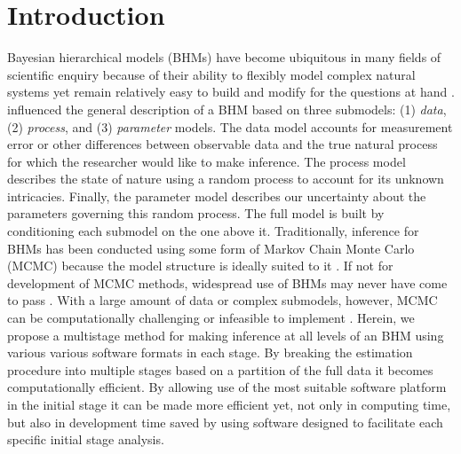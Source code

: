 \documentclass[12pt]{article}
\begin{document}
\vspace*{\fill}

\clearpage

\renewcommand{\baselinestretch}{1.5}\normalsize
\raggedright
\setlength{\parindent}{2em}
\raggedbottom
\linenumbers

\section{Introduction}


Bayesian hierarchical models (BHMs) have become ubiquitous in many fields of scientific enquiry because of their ability to flexibly model complex natural systems yet remain relatively easy to build and modify for the questions at hand \citep{hobbs2015bayesian}. \citet{berliner1996hierarchical} influenced the general description of a BHM based on three submodels: (1) {\it data}, (2) {\it process}, and (3) {\it parameter} models. The data model accounts for measurement error or other differences between observable data and the true natural process for which the researcher would like to make inference. The process model describes the state of nature using a random process to account for its unknown intricacies. Finally, the parameter model describes our uncertainty about the parameters governing this random process.  The full model is built by conditioning each submodel on the one above it. Traditionally, inference for BHMs has been conducted using some form of Markov Chain Monte Carlo (MCMC) because the model structure is ideally suited to it \citep{gelfand1990sampling,gelfand2015hierarchical}. If not for development of MCMC methods, widespread use of BHMs may never have come to pass \citep{green2015bayesian}. With a large amount of data or complex submodels, however, MCMC can be computationally challenging or infeasible to implement \citep{hooten2018prior, wikle2003hierarchical}. Herein, we propose a multistage method for making inference at all levels of an BHM using various various software formats in each stage. By breaking the estimation procedure into multiple stages based on a partition of the full data it becomes computationally efficient. By allowing use of the most suitable software platform in the initial stage it can be made more efficient yet, not only in computing time, but also in development time saved by using software designed to facilitate each specific initial stage analysis. 
\end{document}
